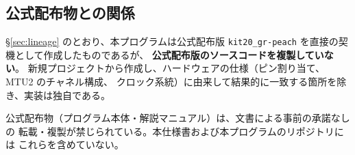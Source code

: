 \documentclass[a4paper,11pt,dvipdfmx]{jsarticle}
\begin{document}
\subsection{公式配布物との関係}

\hyperref[sec:lineage]{§\ref*{sec:lineage}} のとおり、本プログラムは公式配布版
\texttt{kit20\_gr-peach} を直接の契機として作成したものであるが、
\textbf{公式配布版のソースコードを複製していない}。
新規プロジェクトから作成し、ハードウェアの仕様（ピン割り当て、MTU2 のチャネル構成、
クロック系統）に由来して結果的に一致する箇所を除き、実装は独自である。

公式配布物（プログラム本体・解説マニュアル）は、文書による事前の承諾なしの
転載・複製が禁じられている。本仕様書および本プログラムのリポジトリには
これらを含めていない。
\end{document}
